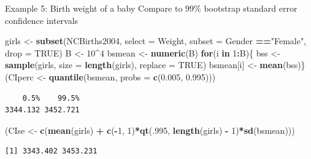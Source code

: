 \documentclass[
  ignorenonframetext,
]{beamer}
\newenvironment{Shaded}{\begin{snugshade}}{\end{snugshade}}
\newcommand{\AttributeTok}[1]{\textcolor[rgb]{0.13,0.29,0.53}{#1}}
\newcommand{\ConstantTok}[1]{\textcolor[rgb]{0.56,0.35,0.01}{#1}}
\newcommand{\ControlFlowTok}[1]{\textcolor[rgb]{0.13,0.29,0.53}{\textbf{#1}}}
\newcommand{\DecValTok}[1]{\textcolor[rgb]{0.00,0.00,0.81}{#1}}
\newcommand{\FloatTok}[1]{\textcolor[rgb]{0.00,0.00,0.81}{#1}}
\newcommand{\FunctionTok}[1]{\textcolor[rgb]{0.13,0.29,0.53}{\textbf{#1}}}
\newcommand{\NormalTok}[1]{#1}
\newcommand{\OtherTok}[1]{\textcolor[rgb]{0.56,0.35,0.01}{#1}}
\newcommand{\SpecialCharTok}[1]{\textcolor[rgb]{0.81,0.36,0.00}{\textbf{#1}}}
\newcommand{\StringTok}[1]{\textcolor[rgb]{0.31,0.60,0.02}{#1}}
\begin{document}
\begin{frame}[fragile]{Example 5: Birth weight of a baby}
\label{example-5-birth-weight-of-a-baby-6}
Compare to \(99\%\) bootstrap standard error confidence intervals
\normalsize

\begin{Shaded}
\begin{Highlighting}[]
\NormalTok{girls }\OtherTok{\textless{}{-}} \FunctionTok{subset}\NormalTok{(NCBirths2004, }\AttributeTok{select =}\NormalTok{ Weight, }
                \AttributeTok{subset =}\NormalTok{ Gender }\SpecialCharTok{==}\StringTok{"Female"}\NormalTok{, }\AttributeTok{drop =} \ConstantTok{TRUE}\NormalTok{)}
\NormalTok{B }\OtherTok{\textless{}{-}} \DecValTok{10}\SpecialCharTok{\^{}}\DecValTok{4}
\NormalTok{bsmean }\OtherTok{\textless{}{-}} \FunctionTok{numeric}\NormalTok{(B)}
\ControlFlowTok{for}\NormalTok{(i }\ControlFlowTok{in} \DecValTok{1}\SpecialCharTok{:}\NormalTok{B)\{}
\NormalTok{  bss }\OtherTok{\textless{}{-}} \FunctionTok{sample}\NormalTok{(girls, }\AttributeTok{size =} \FunctionTok{length}\NormalTok{(girls), }\AttributeTok{replace =} \ConstantTok{TRUE}\NormalTok{)}
\NormalTok{  bsmean[i] }\OtherTok{\textless{}{-}} \FunctionTok{mean}\NormalTok{(bss)\}}
\NormalTok{(CIperc }\OtherTok{\textless{}{-}} \FunctionTok{quantile}\NormalTok{(bsmean, }\AttributeTok{probs =} \FunctionTok{c}\NormalTok{(}\FloatTok{0.005}\NormalTok{, }\FloatTok{0.995}\NormalTok{)))}
\end{Highlighting}
\end{Shaded}

\begin{verbatim}
    0.5%    99.5% 
3344.132 3452.721 
\end{verbatim}

\begin{Shaded}
\begin{Highlighting}[]
\NormalTok{(CIse }\OtherTok{\textless{}{-}} \FunctionTok{c}\NormalTok{(}\FunctionTok{mean}\NormalTok{(girls) }\SpecialCharTok{+} 
    \FunctionTok{c}\NormalTok{(}\SpecialCharTok{{-}}\DecValTok{1}\NormalTok{, }\DecValTok{1}\NormalTok{)}\SpecialCharTok{*}\FunctionTok{qt}\NormalTok{(.}\DecValTok{995}\NormalTok{, }\FunctionTok{length}\NormalTok{(girls) }\SpecialCharTok{{-}} \DecValTok{1}\NormalTok{)}\SpecialCharTok{*}\FunctionTok{sd}\NormalTok{(bsmean)))}
\end{Highlighting}
\end{Shaded}

\begin{verbatim}
[1] 3343.402 3453.231
\end{verbatim}

\normalsize
\end{frame}
\end{document}
